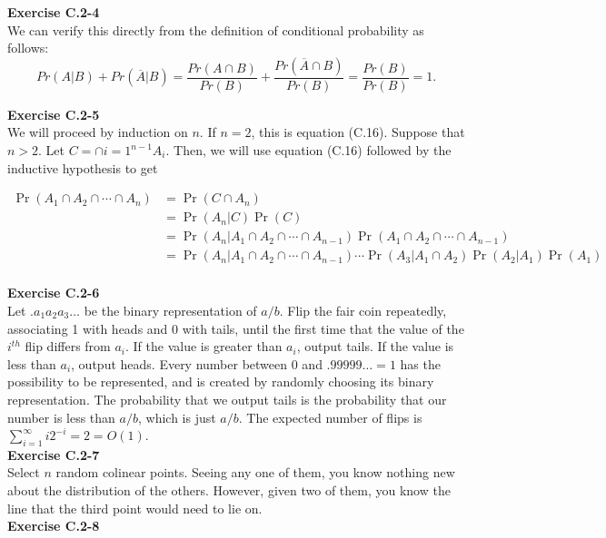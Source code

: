 \documentclass{article}
\begin{document}
\noindent\textbf{Exercise C.2-4}\\

We can verify this directly from the definition of conditional probability as follows:
\[Pr(A|B) + Pr(\overline{A} | B) = \frac{Pr(A \cap B)}{Pr(B)} + \frac{Pr(\overline{A} \cap B)}{Pr(B)} = \frac{Pr(B)}{Pr(B)} = 1.\]

\noindent\textbf{Exercise C.2-5}\\

We will proceed by induction on $n$. If $n=2$, this is equation (C.16). Suppose that $n>2$. Let $C = \cap{i=1}^{n-1} A_i$. Then, we will use equation (C.16) followed by the inductive hypothesis to get

\begin{align*}
\Pr(A_1 \cap A_2 \cap \cdots \cap A_n) &= \Pr(C \cap A_n)\\
&= \Pr(A_n | C) \Pr(C)\\
&= \Pr(A_n | A_1 \cap A_2 \cap \cdots \cap A_{n-1}) \Pr( A_1 \cap A_2 \cap \cdots \cap A_{n-1})\\
&= \Pr(A_n | A_1 \cap A_2 \cap \cdots \cap A_{n-1}) \cdots \Pr(A_3 | A_1 \cap A_2)\Pr(A_2 | A_1) \Pr(A_1)\\
\end{align*}

\noindent\textbf{Exercise C.2-6}\\

Let $.a_1a_2a_3\ldots$ be the binary representation of $a/b$.  Flip the fair coin repeatedly, associating 1 with heads and 0 with tails, until the first time that the value of the $i^{th}$ flip differs from $a_i$.  If the value is greater than $a_i$, output tails.  If the value is less than $a_i$, output heads.  Every number between 0 and $.99999\ldots = 1$ has the possibility to be represented, and is created by randomly choosing its binary representation.  The probability that we output tails is the probability that our number is less than $a/b$, which is just $a/b$.  The expected number of flips is $\sum_{i=1}^\infty i2^{-i} = 2 = O(1)$. \\

\noindent\textbf{Exercise C.2-7}\\

Select $n$ random colinear points. Seeing any one of them, you know nothing new about the distribution of the others. However, given two of them, you know the line that the third point would need to lie on.\\


\noindent\textbf{Exercise C.2-8}\\
\end{document}
